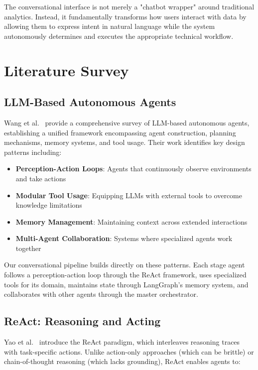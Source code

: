 \documentclass[11pt,a4paper]{article}
\begin{document}
The conversational interface is not merely a "chatbot wrapper" around traditional analytics. Instead, it fundamentally transforms how users interact with data by allowing them to express intent in natural language while the system autonomously determines and executes the appropriate technical workflow.

\section{Literature Survey}

\subsection{LLM-Based Autonomous Agents}

Wang et al.~\cite{wang2023survey} provide a comprehensive survey of LLM-based autonomous agents, establishing a unified framework encompassing agent construction, planning mechanisms, memory systems, and tool usage. Their work identifies key design patterns including:

\begin{itemize}
    \item \textbf{Perception-Action Loops}: Agents that continuously observe environments and take actions
    \item \textbf{Modular Tool Usage}: Equipping LLMs with external tools to overcome knowledge limitations
    \item \textbf{Memory Management}: Maintaining context across extended interactions
    \item \textbf{Multi-Agent Collaboration}: Systems where specialized agents work together
\end{itemize}

Our conversational pipeline builds directly on these patterns. Each stage agent follows a perception-action loop through the ReAct framework, uses specialized tools for its domain, maintains state through LangGraph's memory system, and collaborates with other agents through the master orchestrator.

\subsection{ReAct: Reasoning and Acting}

Yao et al.~\cite{react} introduce the ReAct paradigm, which interleaves reasoning traces with task-specific actions. Unlike action-only approaches (which can be brittle) or chain-of-thought reasoning (which lacks grounding), ReAct enables agents to:
\end{document}
